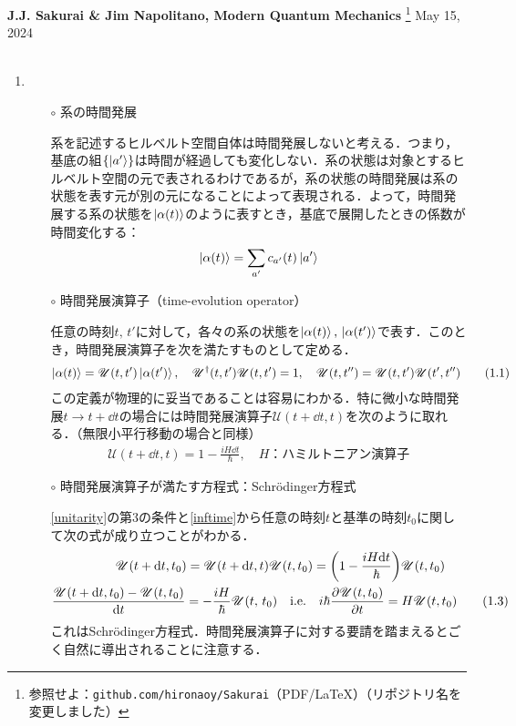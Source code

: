 \documentclass{jarticle}
\begin{document}
\noindent
\textbf{J.J. Sakurai \& Jim Napolitano, Modern Quantum Mechanics}
\footnote{
参照せよ：\texttt{github.com/hironaoy/Sakurai}（PDF/\LaTeX）（リポジトリ名を変更しました）
}
\hfill May 15, 2024\vspace{-2mm} \\
\hrulefill \\

\noindent
\begin{enumerate}
\item {}

  \begin{itemize}
  \item [$\circ$] 系の時間発展

    系を記述するヒルベルト空間自体は時間発展しないと考える．つまり，基底の組$\qty{\ket{a'}}$は時間が経過しても変化しない．系の状態は対象とするヒルベルト空間の元で表されるわけであるが，系の状態の時間発展は系の状態を表す元が別の元になることによって表現される．よって，時間発展する系の状態を$\ket{\alpha(t)}$のように表すとき，基底で展開したときの係数が時間変化する：
    \begin{align}
      \ket{\alpha(t)} = \sum_{a'} c_{a'}(t) \ket{a'}
    \end{align}

  \item [$\circ$] 時間発展演算子（time-evolution operator）

    任意の時刻$t, \, t'$に対して，各々の系の状態を$\ket{\alpha(t)}, \, \ket{\alpha(t')}$で表す．このとき，時間発展演算子を次を満たすものとして定める．
    \begin{align}
      \ket{\alpha(t)} = \mathscr{U}(t, t')\ket{\alpha(t')}, \quad \mathscr{U}^\dagger(t, t') \mathscr{U}(t, t') = 1, \quad \mathscr{U}(t, t'') = \mathscr{U}(t, t') \mathscr{U}(t', t'') \tag{1.1} \label{unitarity}
    \end{align}
    この定義が物理的に妥当であることは容易にわかる．特に微小な時間発展$t \longrightarrow t + \dd t$の場合には時間発展演算子$\mathscr{U}(t + \dd t, t)$を次のように取れる．（無限小平行移動の場合と同様）
    \begin{align}
      \mathscr{U}(t + \dd t, t) = 1 - \frac{i H \dd t}{\hbar}, \quad H：ハミルトニアン演算子 \tag{1.2} \label{inftime}
    \end{align}
    
    
  \item [$\circ$] 時間発展演算子が満たす方程式：Schrödinger方程式

    \eqref{unitarity}の第3の条件と\eqref{inftime}から任意の時刻$t$と基準の時刻$t_0$に関して次の式が成り立つことがわかる．
    \begin{gather}
      \mathscr{U}(t + \dd t, t_0) = \mathscr{U}(t + \dd t, t)\mathscr{U}(t, t_0) = \qty(1 - \frac{i H \dd t}{\hbar}) \mathscr{U}(t, t_0) \\
      \frac{\mathscr{U}(t + \dd t, t_0) - \mathscr{U}(t, t_0)}{\dd t} = - \frac{iH}{\hbar}\mathscr{U}(t, \, t_0) \quad \mathrm{i.e.} \quad i\hbar \pdv{\mathscr{U}(t, t_0)}{t} = H \mathscr{U}(t, t_0) \tag{1.3} \label{schro}
    \end{gather}
    これはSchrödinger方程式．時間発展演算子に対する要請を踏まえるとごく自然に導出されることに注意する．


\end{itemize}
\end{enumerate}
\end{document}
